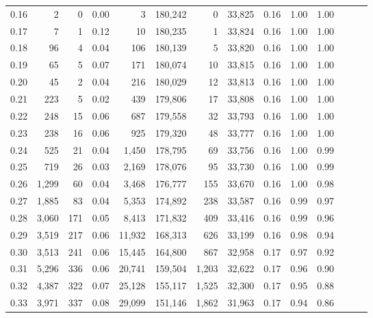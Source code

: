 \begin{tabular}{rrrrrrrrrrrrrr}
0.16 &       2 &      0 &  0.00 &        3 &  180,242 &       0 &  33,825 &  0.16 &  1.00 &      1.00 \\
0.17 &       7 &      1 &  0.12 &       10 &  180,235 &       1 &  33,824 &  0.16 &  1.00 &      1.00 \\
0.18 &      96 &      4 &  0.04 &      106 &  180,139 &       5 &  33,820 &  0.16 &  1.00 &      1.00 \\
0.19 &      65 &      5 &  0.07 &      171 &  180,074 &      10 &  33,815 &  0.16 &  1.00 &      1.00 \\
0.20 &      45 &      2 &  0.04 &      216 &  180,029 &      12 &  33,813 &  0.16 &  1.00 &      1.00 \\
0.21 &     223 &      5 &  0.02 &      439 &  179,806 &      17 &  33,808 &  0.16 &  1.00 &      1.00 \\
0.22 &     248 &     15 &  0.06 &      687 &  179,558 &      32 &  33,793 &  0.16 &  1.00 &      1.00 \\
0.23 &     238 &     16 &  0.06 &      925 &  179,320 &      48 &  33,777 &  0.16 &  1.00 &      1.00 \\
0.24 &     525 &     21 &  0.04 &    1,450 &  178,795 &      69 &  33,756 &  0.16 &  1.00 &      0.99 \\
0.25 &     719 &     26 &  0.03 &    2,169 &  178,076 &      95 &  33,730 &  0.16 &  1.00 &      0.99 \\
0.26 &   1,299 &     60 &  0.04 &    3,468 &  176,777 &     155 &  33,670 &  0.16 &  1.00 &      0.98 \\
0.27 &   1,885 &     83 &  0.04 &    5,353 &  174,892 &     238 &  33,587 &  0.16 &  0.99 &      0.97 \\
0.28 &   3,060 &    171 &  0.05 &    8,413 &  171,832 &     409 &  33,416 &  0.16 &  0.99 &      0.96 \\
0.29 &   3,519 &    217 &  0.06 &   11,932 &  168,313 &     626 &  33,199 &  0.16 &  0.98 &      0.94 \\
0.30 &   3,513 &    241 &  0.06 &   15,445 &  164,800 &     867 &  32,958 &  0.17 &  0.97 &      0.92 \\
0.31 &   5,296 &    336 &  0.06 &   20,741 &  159,504 &   1,203 &  32,622 &  0.17 &  0.96 &      0.90 \\
0.32 &   4,387 &    322 &  0.07 &   25,128 &  155,117 &   1,525 &  32,300 &  0.17 &  0.95 &      0.88 \\
0.33 &   3,971 &    337 &  0.08 &   29,099 &  151,146 &   1,862 &  31,963 &  0.17 &  0.94 &      0.86 \\

\end{tabular}
